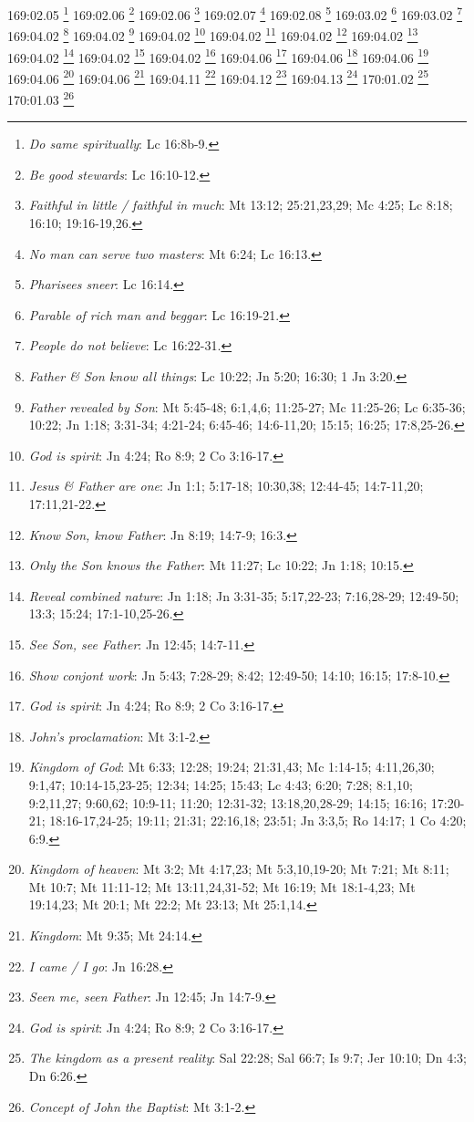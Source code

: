 169:02.05 \footnote{\textit{Do same spiritually}: Lc 16:8b-9.}
169:02.06 \footnote{\textit{Be good stewards}: Lc 16:10-12.}
169:02.06 \footnote{\textit{Faithful in little / faithful in much}: Mt 13:12; 25:21,23,29; Mc 4:25; Lc 8:18; 16:10; 19:16-19,26.}
169:02.07 \footnote{\textit{No man can serve two masters}: Mt 6:24; Lc 16:13.}
169:02.08 \footnote{\textit{Pharisees sneer}: Lc 16:14.}
169:03.02 \footnote{\textit{Parable of rich man and beggar}: Lc 16:19-21.}
169:03.02 \footnote{\textit{People do not believe}: Lc 16:22-31.}
169:04.02 \footnote{\textit{Father & Son know all things}: Lc 10:22; Jn 5:20; 16:30; 1 Jn 3:20.}
169:04.02 \footnote{\textit{Father revealed by Son}: Mt 5:45-48; 6:1,4,6; 11:25-27; Mc 11:25-26; Lc 6:35-36; 10:22; Jn 1:18; 3:31-34; 4:21-24; 6:45-46; 14:6-11,20; 15:15; 16:25; 17:8,25-26.}
169:04.02 \footnote{\textit{God is spirit}: Jn 4:24; Ro 8:9; 2 Co 3:16-17.}
169:04.02 \footnote{\textit{Jesus & Father are one}: Jn 1:1; 5:17-18; 10:30,38; 12:44-45; 14:7-11,20; 17:11,21-22.}
169:04.02 \footnote{\textit{Know Son, know Father}: Jn 8:19; 14:7-9; 16:3.}
169:04.02 \footnote{\textit{Only the Son knows the Father}: Mt 11:27; Lc 10:22; Jn 1:18; 10:15.}
169:04.02 \footnote{\textit{Reveal combined nature}: Jn 1:18; Jn 3:31-35; 5:17,22-23; 7:16,28-29; 12:49-50; 13:3; 15:24; 17:1-10,25-26.}
169:04.02 \footnote{\textit{See Son, see Father}: Jn 12:45; 14:7-11.}
169:04.02 \footnote{\textit{Show conjont work}: Jn 5:43; 7:28-29; 8:42; 12:49-50; 14:10; 16:15; 17:8-10.}
169:04.06 \footnote{\textit{God is spirit}: Jn 4:24; Ro 8:9; 2 Co 3:16-17.}
169:04.06 \footnote{\textit{John's proclamation}: Mt 3:1-2.}
169:04.06 \footnote{\textit{Kingdom of God}: Mt 6:33; 12:28; 19:24; 21:31,43; Mc 1:14-15; 4:11,26,30; 9:1,47; 10:14-15,23-25; 12:34; 14:25; 15:43; Lc 4:43; 6:20; 7:28; 8:1,10; 9:2,11,27; 9:60,62; 10:9-11; 11:20; 12:31-32; 13:18,20,28-29; 14:15; 16:16; 17:20-21; 18:16-17,24-25; 19:11; 21:31; 22:16,18; 23:51; Jn 3:3,5; Ro 14:17; 1 Co 4:20; 6:9.}
169:04.06 \footnote{\textit{Kingdom of heaven}: Mt 3:2; Mt 4:17,23; Mt 5:3,10,19-20; Mt 7:21; Mt 8:11; Mt 10:7; Mt 11:11-12; Mt 13:11,24,31-52; Mt 16:19; Mt 18:1-4,23; Mt 19:14,23; Mt 20:1; Mt 22:2; Mt 23:13; Mt 25:1,14.}
169:04.06 \footnote{\textit{Kingdom}: Mt 9:35; Mt 24:14.}
169:04.11 \footnote{\textit{I came / I go}: Jn 16:28.}
169:04.12 \footnote{\textit{Seen me, seen Father}: Jn 12:45; Jn 14:7-9.}
169:04.13 \footnote{\textit{God is spirit}: Jn 4:24; Ro 8:9; 2 Co 3:16-17.}
170:01.02 \footnote{\textit{The kingdom as a present reality}: Sal 22:28; Sal 66:7; Is 9:7; Jer 10:10; Dn 4:3; Dn 6:26.}
170:01.03 \footnote{\textit{Concept of John the Baptist}: Mt 3:1-2.}
